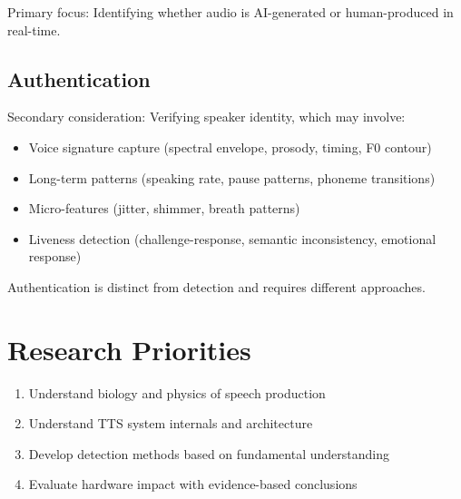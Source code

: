 \documentclass{article}
\begin{document}
Primary focus: Identifying whether audio is AI-generated or human-produced in real-time.

\subsection{Authentication}

Secondary consideration: Verifying speaker identity, which may involve:
\begin{itemize}
    \item Voice signature capture (spectral envelope, prosody, timing, F0 contour)
    \item Long-term patterns (speaking rate, pause patterns, phoneme transitions)
    \item Micro-features (jitter, shimmer, breath patterns)
    \item Liveness detection (challenge-response, semantic inconsistency, emotional response)
\end{itemize}

Authentication is distinct from detection and requires different approaches.

\section{Research Priorities}

\begin{enumerate}
    \item Understand biology and physics of speech production
    \item Understand TTS system internals and architecture
    \item Develop detection methods based on fundamental understanding
    \item Evaluate hardware impact with evidence-based conclusions
\end{enumerate}
\end{document}
